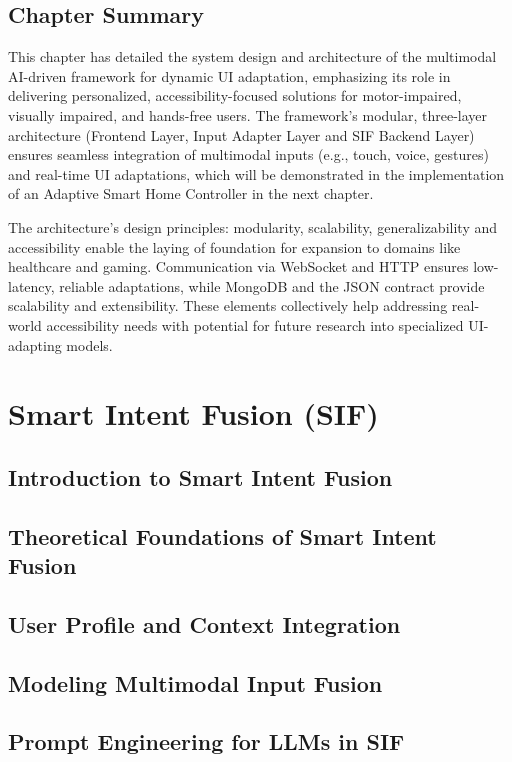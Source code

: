 \documentclass[openany]{book}
\begin{document}
\section{Chapter Summary}
This chapter has detailed the system design and architecture of the multimodal AI-driven framework for dynamic UI adaptation, emphasizing its role in delivering personalized, accessibility-focused solutions for motor-impaired, visually impaired, and hands-free users. The framework’s modular, three-layer architecture (Frontend Layer, Input Adapter Layer and SIF Backend Layer) ensures seamless integration of multimodal inputs (e.g., touch, voice, gestures) and real-time UI adaptations, which will be demonstrated in the implementation of an Adaptive Smart Home Controller in the next chapter. 

The architecture’s design principles: modularity, scalability, generalizability and accessibility enable the laying of foundation for expansion to domains like healthcare and gaming. Communication via WebSocket and HTTP ensures low-latency, reliable adaptations, while MongoDB and the JSON contract provide scalability and extensibility. These elements collectively help addressing real-world accessibility needs with potential for future research into specialized UI-adapting models.


\chapter{Smart Intent Fusion (SIF)}
\section{Introduction to Smart Intent Fusion}

\section{Theoretical Foundations of Smart Intent Fusion}

\section{User Profile and Context Integration}

\section{Modeling Multimodal Input Fusion}

\section{Prompt Engineering for LLMs in SIF}
\end{document}
